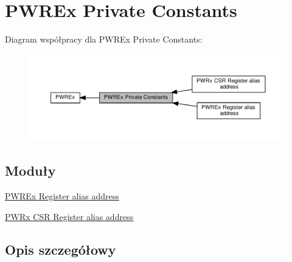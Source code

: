 \hypertarget{group___p_w_r_ex___private___constants}{}\section{P\+W\+R\+Ex Private Constants}
\label{group___p_w_r_ex___private___constants}
Diagram współpracy dla P\+W\+R\+Ex Private Constants\+:\nopagebreak
\begin{figure}[H]
\begin{center}
\leavevmode
\includegraphics[width=350pt]{group___p_w_r_ex___private___constants}
\end{center}
\end{figure}
\subsection*{Moduły}
\begin{DoxyCompactItemize}
\item 
\hyperlink{group___p_w_r_ex__register__alias__address}{P\+W\+R\+Ex Register alias address}
\item 
\hyperlink{group___p_w_r_ex___c_s_r__register__alias}{P\+W\+Rx C\+S\+R Register alias address}
\end{DoxyCompactItemize}


\subsection{Opis szczegółowy}
